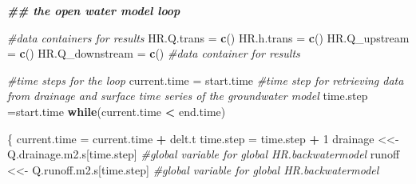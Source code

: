 \documentclass[
]{article}
\newenvironment{Shaded}{\begin{snugshade}}{\end{snugshade}}
\newcommand{\CommentTok}[1]{\textcolor[rgb]{0.56,0.35,0.01}{\textit{#1}}}
\newcommand{\ControlFlowTok}[1]{\textcolor[rgb]{0.13,0.29,0.53}{\textbf{#1}}}
\newcommand{\DecValTok}[1]{\textcolor[rgb]{0.00,0.00,0.81}{#1}}
\newcommand{\DocumentationTok}[1]{\textcolor[rgb]{0.56,0.35,0.01}{\textbf{\textit{#1}}}}
\newcommand{\FunctionTok}[1]{\textcolor[rgb]{0.13,0.29,0.53}{\textbf{#1}}}
\newcommand{\NormalTok}[1]{#1}
\newcommand{\OtherTok}[1]{\textcolor[rgb]{0.56,0.35,0.01}{#1}}
\newcommand{\SpecialCharTok}[1]{\textcolor[rgb]{0.81,0.36,0.00}{\textbf{#1}}}
\begin{document}
\begin{Shaded}
\begin{Highlighting}[]
  
  \DocumentationTok{\#\# the open water model loop}
  
  
  \CommentTok{\#data containers for results}
\NormalTok{  HR.Q.trans }\OtherTok{=} \FunctionTok{c}\NormalTok{()}
\NormalTok{  HR.h.trans }\OtherTok{=} \FunctionTok{c}\NormalTok{()}
\NormalTok{  HR.Q\_upstream }\OtherTok{=} \FunctionTok{c}\NormalTok{()}
\NormalTok{  HR.Q\_downstream }\OtherTok{=} \FunctionTok{c}\NormalTok{()}
  \CommentTok{\#data container for results}
  
  \CommentTok{\#time steps for the loop}
\NormalTok{  current.time }\OtherTok{=}\NormalTok{ start.time}
  \CommentTok{\#time step for retrieving data from drainage and surface time series of the groundwater model}
\NormalTok{  time.step }\OtherTok{=}\NormalTok{start.time}
  \ControlFlowTok{while}\NormalTok{(current.time }\SpecialCharTok{\textless{}}\NormalTok{ end.time)}
    
\NormalTok{  \{}
\NormalTok{    current.time }\OtherTok{=}\NormalTok{ current.time }\SpecialCharTok{+}\NormalTok{ delt.t}
\NormalTok{    time.step }\OtherTok{=}\NormalTok{ time.step }\SpecialCharTok{+} \DecValTok{1}
\NormalTok{    drainage }\OtherTok{\textless{}\textless{}{-}}\NormalTok{ Q.drainage.m2.s[time.step]  }\CommentTok{\#global variable for global HR.backwatermodel}
\NormalTok{    runoff }\OtherTok{\textless{}\textless{}{-}}\NormalTok{ Q.runoff.m2.s[time.step]  }\CommentTok{\#global variable for global HR.backwatermodel}
    

\end{Highlighting}
\end{Shaded}
\end{document}
